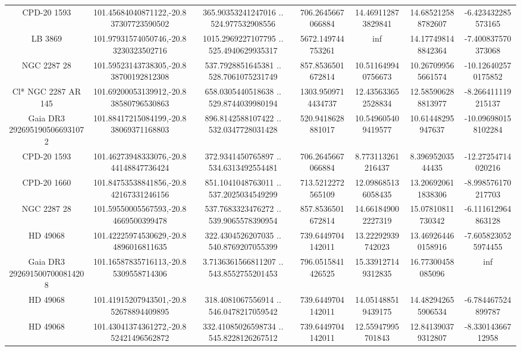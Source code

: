 \begin{table}
\begin{tabular}{ccccccc}
CPD-20  1593 & 101.45684040871122,-20.837307723590502 & 365.90353241247016 .. 524.977532908556 & 706.2645667066884 & 14.469112873829841 & 14.685212588782607 & -6.423432285573165 \\
LB  3869 & 101.97931574050746,-20.83230323502716 & 1015.2969227107795 .. 525.4940629935317 & 5672.149744753261 & inf & 14.177498148842364 & -7.400837570373068 \\
NGC  2287    28 & 101.59523143738305,-20.838700192812308 & 537.7928851645381 .. 528.7061075231749 & 857.8536501672814 & 10.511649940756673 & 10.267099565661574 & -10.126402570175852 \\
Cl* NGC 2287     AR     145 & 101.69200053139912,-20.838580796530863 & 658.0305440518638 .. 529.8744039980194 & 1303.9509714434737 & 12.435633652528834 & 12.585906288813977 & -8.266411119215137 \\
Gaia DR3 2926951905066931072 & 101.88417215084199,-20.838069371168803 & 896.8142588107422 .. 532.0347728031428 & 520.9418628881017 & 10.549605409419577 & 10.61448295947637 & -10.096980158102284 \\
CPD-20  1593 & 101.46273948333076,-20.844148847736424 & 372.9341450765897 .. 534.6313492554481 & 706.2645667066884 & 8.773113261216437 & 8.39695203544435 & -12.27254714020216 \\
CPD-20  1660 & 101.84753538841856,-20.842167331246156 & 851.1041048763011 .. 537.2025034549299 & 713.5212272565109 & 12.098685136058435 & 13.206920611838306 & -8.998576170217703 \\
NGC  2287    28 & 101.59550005567593,-20.84669500399478 & 537.7683323476272 .. 539.9065578390954 & 857.8536501672814 & 14.661849002227319 & 15.07810811730342 & -6.111612964863128 \\
HD  49068 & 101.42225974530629,-20.84896016811635 & 322.4304526207035 .. 540.8769207055399 & 739.6449704142011 & 13.22292939742023 & 13.469264460158916 & -7.6058230525974455 \\
Gaia DR3 2926915007000814208 & 101.16587835716113,-20.85309558714306 & 3.7136361566811207 .. 543.8552755201453 & 796.0515841426525 & 15.339127149312835 & 16.77300458085096 & inf \\
HD  49068 & 101.41915207943501,-20.852678894409895 & 318.4081067556914 .. 546.0478217059542 & 739.6449704142011 & 14.051488519439175 & 14.482942655906534 & -6.784467524899787 \\
HD  49068 & 101.43041374361272,-20.852421496562872 & 332.41085026598734 .. 545.8228126267512 & 739.6449704142011 & 12.55947995701843 & 12.841390379312807 & -8.33014366712958 \\

\end{tabular}
\end{table}
